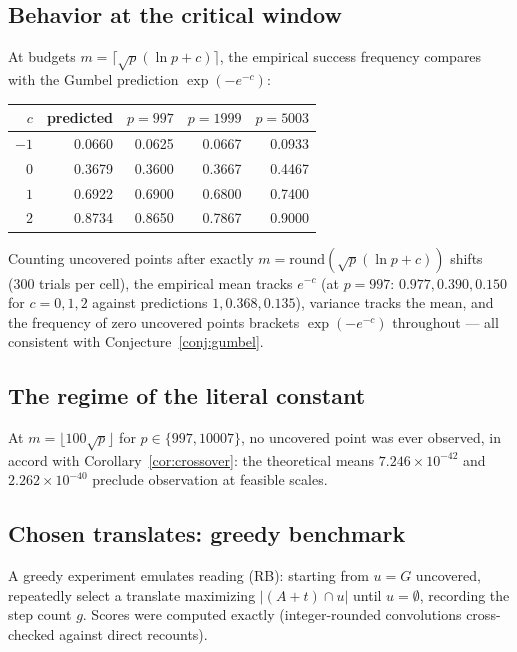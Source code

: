 \documentclass[11pt]{article}
\theoremstyle{definition}
\begin{document}
\subsection{Behavior at the critical window}
At budgets $m=\lceil\sqrt p(\ln p+c)\rceil$, the empirical success frequency
compares with the Gumbel prediction $\exp(-e^{-c})$:

\begin{center}
\begin{tabular}{rrrrr}
\toprule
$c$ & predicted & $p=997$ & $p=1999$ & $p=5003$\\
\midrule
$-1$ & 0.0660 & 0.0625 & 0.0667 & 0.0933\\
$0$ & 0.3679 & 0.3600 & 0.3667 & 0.4467\\
$1$ & 0.6922 & 0.6900 & 0.6800 & 0.7400\\
$2$ & 0.8734 & 0.8650 & 0.7867 & 0.9000\\
\bottomrule
\end{tabular}
\end{center}

Counting uncovered points after exactly $m=\mathrm{round}(\sqrt p(\ln p+c))$
shifts (300 trials per cell), the empirical mean tracks $e^{-c}$ (at $p=997$:
$0.977,0.390,0.150$ for $c=0,1,2$ against predictions $1,0.368,0.135$),
variance tracks the mean, and the frequency of zero uncovered points brackets
$\exp(-e^{-c})$ throughout --- all consistent with
Conjecture~\ref{conj:gumbel}.

\subsection{The regime of the literal constant}
At $m=\lfloor100\sqrt p\rfloor$ for $p\in\{997,10007\}$, no uncovered point
was ever observed, in accord with Corollary~\ref{cor:crossover}:
the theoretical means $7.246\times10^{-42}$ and
$2.262\times10^{-40}$ preclude observation at feasible scales.

\subsection{Chosen translates: greedy benchmark}
A greedy experiment emulates reading (RB): starting from $u=G$ uncovered,
repeatedly select a translate maximizing $|(A+t)\cap u|$ until $u=\emptyset$,
recording the step count $g$. Scores were computed exactly (integer-rounded
convolutions cross-checked against direct recounts).
\end{document}

